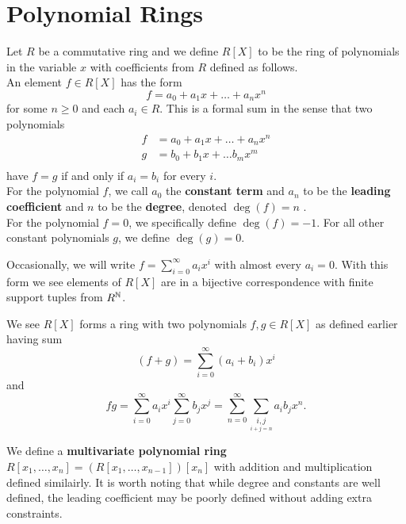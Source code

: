 \section{Polynomial Rings}
\begin{definition}
	Let \(R\) be a commutative ring and we define \(R\left[ X \right] \) to be the ring of polynomials in the variable \(x\) with coefficients from \(R\) defined as follows.\\
	An element \(f \in R\left[ X \right] \) has the form \[
	f = a_0 + a_1x + \ldots + a_{n} x^{n}
	\] for some \(n \ge 0\) and each \(a_{i} \in R\). This is a formal sum in the sense that two polynomials
	\begin{align*}
		f&= a_0 + a_1x + \ldots + a_{n}x^{n} \\
		g&= b_0 + b_1 x + \ldots b_{m} x^{m}  \\
	\end{align*} have \(f = g\) if and only if \(a_{i} = b_{i}\) for every \(i\).\\
For the polynomial \(f\), we call \(a_0\) the \textbf{constant term} and \(a_{n}\) to be the \textbf{leading coefficient} and \(n\) to be the \textbf{degree}, denoted \(\deg \left( f \right) = n\) .\\
For the polynomial \(f = 0\), we specifically define \(\deg \left(  f \right) = -1\). For all other constant polynomials \(g\), we define \(\deg \left( g \right) = 0\).
\end{definition}
\begin{remark}
	Occasionally, we will write \(f = \sum_{i=0}^{\infty} a_{i} x^{i}\) with almost every \(a_{i} = 0\). With this form we see elements of \(R\left[ X \right] \) are in a bijective correspondence with finite support tuples from \(R^{\mathbb{N}}\).
\end{remark}
We see \(R\left[ X \right] \) forms a ring with two polynomials \(f, g \in R\left[ X \right] \) as defined earlier having sum \[
	\left( f + g \right)  = \sum_{i=0}^{\infty} \left( a_{i} + b_{i} \right) x^{i}
\] and \[
fg = \sum_{i=0}^{\infty} a_{i} x^{i} \sum_{j=0 }^{\infty} b_{j}x^{j} = \sum_{n=0}^{\infty} \sum_{\underset{i + j = n}{i ,j}}^{}a_{i}b_{j} x^{n}
.\]
\begin{definition}
We define a \textbf{multivariate polynomial ring}	\(R \left[ x_1, \ldots, x_{n} \right] = \left( R\left[ x_1, \ldots, x_{n-1} \right]  \right) \left[ x_{n} \right]  \) with addition and multiplication defined similairly. It is worth noting that while degree and constants are well defined, the leading coefficient may be poorly defined without adding extra constraints.
\end{definition}
